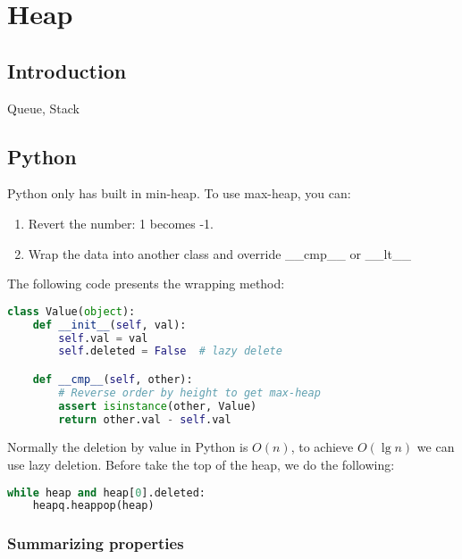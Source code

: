 \chapter{Heap}


\section{Introduction}
Queue, Stack

\section{Python}
Python only has built in min-heap. To use max-heap, you can: 
\begin{enumerate}
\item Revert the number: 1 becomes -1.
\item Wrap the data into another class and override \_\_cmp\_\_ or \_\_lt\_\_
\end{enumerate}

The following code presents the wrapping method:
\begin{lstlisting}[language=python]
class Value(object):
    def __init__(self, val):
        self.val = val
        self.deleted = False  # lazy delete 

    def __cmp__(self, other):
        # Reverse order by height to get max-heap
        assert isinstance(other, Value)
        return other.val - self.val
\end{lstlisting}

Normally the deletion by value in Python is $O(n)$, to achieve $O(\lg n)$ we can use lazy deletion. Before take the top of the heap, we do the following:
\begin{lstlisting}[language=python]
while heap and heap[0].deleted:
    heapq.heappop(heap)
\end{lstlisting}
\subsection{Summarizing properties}


